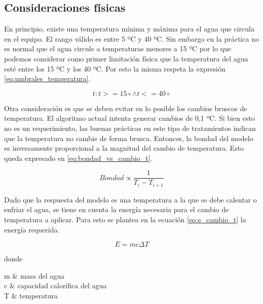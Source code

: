 \subsection{Consideraciones físicas}
En principio, existe una temperatura mínima y máxima para el agua que circula en el equipo. El rango válido es entre 5 ºC y 40 ºC. Sin embargo en la práctica no es normal que el agua circule a temperaturas menores a 15 ºC por lo que podemos considerar como primer limitación física que la temperatura del agua esté entre los 15 ºC y los 40 ºC.  Por esto la misma respeta la expresión \ref{eq:umbrales_temperatura}.

\begin{equation}
	\label{eq:umbrales_temperatura}
	t : t >= 15 \circ \land  t <= 40 \circ
\end{equation}

Otra consideración es que se deben evitar en lo posible los cambios bruscos de temperatura. El algoritmo actual intenta generar cambios de 0,1 ºC. Si bien esto no es un requerimiento, las buenas prácticas en este tipo de tratamientos indican que la temperatura no cambie de forma brusca. Entonces, la bondad del modelo es inversamente proporcional a la magnitud del cambio de temperatura. Esto queda expresado en \ref{eq:bondad_vs_cambio_t}.

\begin{equation}
	\label{eq:bondad_vs_cambio_t}
	Bondad\propto \frac{1}{T_i - T_{i+1}}
\end{equation}

Dado que la respuesta del modelo es una temperatura a la que se debe calentar o enfriar el agua, se tiene en cuenta la energía necesaria para el cambio de temperatura a aplicar. Para esto se plantea en la ecuación \ref{eq:e_cambio_t} la energía requerida.

\begin{equation}
	\label{eq:e_cambio_t}
	E = m c \Delta T
\end{equation}

donde
\begin{conditions}
	m     &  masa del agua \\
	c     &  capacidad calorífica del agua \\   
	T &  temperatura
\end{conditions}

